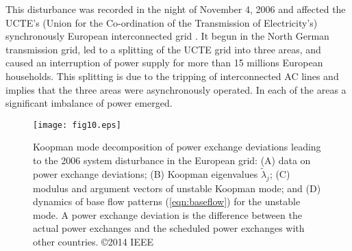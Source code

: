 \documentclass[a4paper,10pt]{article}
\begin{document}
This disturbance was recorded in the night of November 4, 2006 and affected the UCTE's (Union for the Co-ordination of the Transmission of Electricity's) synchronously European interconnected grid \cite{UCTE:2006}.  
It begun in the North German transmission grid, led to a splitting of the UCTE grid into three areas, and caused an interruption of power supply for more than 15 millions European households.  
This splitting is due to the tripping of interconnected AC lines and implies that the three areas were asynchronously operated.  
In each of the areas a significant imbalance of power emerged.  

%
\begin{figure}[t] %
\centering
\texttt{[image: fig10.eps]}
\caption{%
Koopman mode decomposition of power exchange deviations leading to the 2006 system disturbance in the European grid:  
(A) data on power exchange deviations; 
(B) Koopman eigenvalues $\tilde{\lambda}_j$; 
(C) modulus and argument vectors of unstable Koopman mode; and 
(D) dynamics of base flow patterns (\ref{eqn:baseflow}) for the unstable mode.    
A power exchange deviation is the difference between the actual power exchanges and the scheduled power exchanges with other countries.  
\copyright 2014 IEEE
}%
\label{fig:UCTE}
\end{figure}
\end{document}

